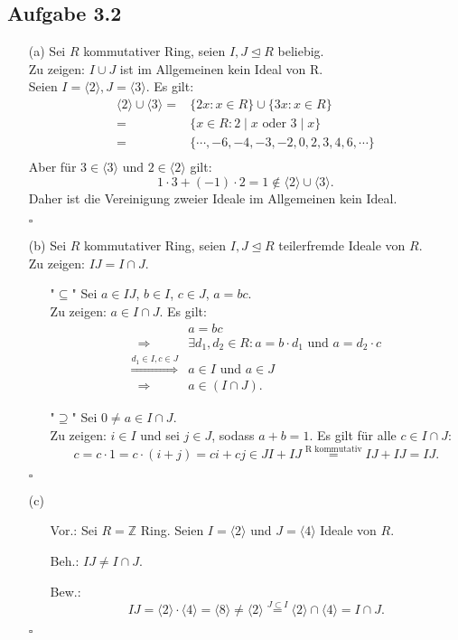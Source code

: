 \documentclass[12pt]{article}
\newcommand{\QED}{\begin{flushright} $\square$ \end{flushright}}
\newcommand{\df}{\enspace\Longrightarrow\enspace}
\newcommand{\isIdeal}{\trianglelefteq}
\newcommand{\ideal}[1]{\langle#1\rangle}
\begin{document}
\subsection*{Aufgabe 3.2}
\begin{enumerate}
	\item[(a)] Sei $R$ kommutativer Ring, seien $I,J\isIdeal R$ beliebig. \\
	Zu zeigen: $I\cup J$ ist im Allgemeinen kein Ideal von R. \\
	Seien $I=\ideal{2},J=\ideal{3}$. Es gilt:
	\begin{align*}
		\ideal{2}\cup\ideal{3}=&\{2x:x\in R\}\cup\{3x:x\in R\} \\
		= &\{x\in R:2\mid x\text{ oder }3\mid x\} \\
		= &\{\cdots,-6,-4,-3,-2,0,2,3,4,6,\cdots\} \\
	\end{align*}
	Aber für $3\in\ideal{3}\text{ und }2\in\ideal{2}$ gilt: \\
	$$1\cdot 3+(-1)\cdot 2=1\notin\ideal{2}\cup\ideal{3}.$$
	Daher ist die Vereinigung zweier Ideale im Allgemeinen kein Ideal.
	\QED
	
	\item[(b)] Sei $R$ kommutativer Ring, seien $I,J\isIdeal R$ teilerfremde Ideale von $R$. \\
	Zu zeigen: $IJ=I\cap J$.
	\begin{enumerate}
		\item["$\subseteq$"] Sei $a\in IJ$, $b\in I$, $c\in J$, $a=bc$. \\
		Zu zeigen: $a\in I\cap J$. Es gilt:
		\begin{align*}
			&a=bc \\
			\df &\exists d_1,d_2\in R:a=b\cdot d_1\text{ und }a=d_2\cdot c \\
			\overset{d_1\in I,c\in J}{\df}&a\in I\text{ und }a\in J \\
			\df &a\in(I\cap J).
		\end{align*}
		
		\item["$\supseteq$"] Sei $0\neq a\in I\cap J$. \\
		Zu zeigen: $i\in I$ und sei $j\in J$, sodass $a+b=1$. Es gilt für alle $c\in I\cap J$:
		$$c=c\cdot 1=c\cdot(i+j)=ci+cj\in JI+IJ\overset{\text{R kommutativ}}{=}IJ+IJ=IJ.$$
	\end{enumerate}
	\QED
	
	\item[(c)]
	\begin{enumerate}
		\item[Vor.:] Sei $R=\mathbb{Z}$ Ring. Seien $I=\ideal{2}$ und $J=\ideal{4}$ Ideale von $R$. \\
		\item[Beh.:] $IJ\neq I\cap J$. \\
		\item[Bew.:] $$IJ=\ideal{2}\cdot\ideal{4}=\ideal{8}\neq\ideal{2}\overset{J\subset I}{=}\ideal{2}\cap\ideal{4}=I\cap J.$$
	\end{enumerate}
	\QED
\end{enumerate}
\end{document}
